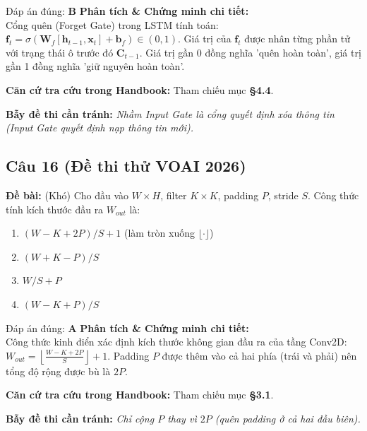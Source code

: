 \documentclass[10pt,a4paper]{article}
\begin{document}
\begin{solbox}{Đáp án đúng: \textbf{B}}
\textbf{Phân tích \& Chứng minh chi tiết:} \\
Cổng quên (Forget Gate) trong LSTM tính toán: $\mathbf{f}_t = \sigma(\mathbf{W}_f [\mathbf{h}_{t-1}, \mathbf{x}_t] + \mathbf{b}_f) \in (0, 1)$. Giá trị của $\mathbf{f}_t$ được nhân từng phần tử với trạng thái ô trước đó $\mathbf{C}_{t-1}$. Giá trị gần 0 đồng nghĩa 'quên hoàn toàn', giá trị gần 1 đồng nghĩa 'giữ nguyên hoàn toàn'.

\vspace{0.4em}
\textbf{Căn cứ tra cứu trong Handbook:} Tham chiếu mục \textbf{§4.4}.

\vspace{0.4em}
\textbf{Bẫy đề thi cần tránh:} \textit{Nhầm Input Gate là cổng quyết định xóa thông tin (Input Gate quyết định nạp thông tin mới).}
\end{solbox}
\vspace{0.5em}


\subsection*{Câu 16 (Đề thi thử VOAI 2026)}
\textbf{Đề bài:} (Khó) Cho đầu vào $W \times H$, filter $K \times K$, padding $P$, stride $S$. Công thức tính kích thước đầu ra $W_{out}$ là:

\begin{enumerate}[label=\textbf{\Alph*.}]
    \item $(W - K + 2P)/S + 1$ (làm tròn xuống $\lfloor \cdot \rfloor$)
    \item $(W + K - P)/S$
    \item $W/S + P$
    \item $(W - K + P)/S$
\end{enumerate}

\begin{solbox}{Đáp án đúng: \textbf{A}}
\textbf{Phân tích \& Chứng minh chi tiết:} \\
Công thức kinh điển xác định kích thước không gian đầu ra của tầng Conv2D: $W_{out} = \left\lfloor \frac{W - K + 2P}{S} \right\rfloor + 1$. Padding $P$ được thêm vào cả hai phía (trái và phải) nên tổng độ rộng được bù là $2P$.

\vspace{0.4em}
\textbf{Căn cứ tra cứu trong Handbook:} Tham chiếu mục \textbf{§3.1}.

\vspace{0.4em}
\textbf{Bẫy đề thi cần tránh:} \textit{Chỉ cộng $P$ thay vì $2P$ (quên padding ở cả hai đầu biên).}
\end{solbox}
\vspace{0.5em}
\end{document}
